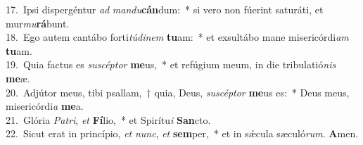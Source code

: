 {17.~}Ipsi dispergéntur \textit{ad} \textit{man}\textit{du}\textbf{cán}dum:~* si vero non fúerint saturáti, et mur\textit{mu}\textbf{rá}bunt.\\
{18.~}Ego autem cantábo forti\textit{tú}\textit{di}\textit{nem} \textbf{tu}am:~* et exsultábo mane misericórdi\textit{am} \textbf{tu}am.\\
{19.~}Quia factus es \textit{su}\textit{scép}\textit{tor} \textbf{me}us,~* et refúgium meum, in die tribulatió\textit{nis} \textbf{me}æ.\\
{20.~}Adjútor meus, tibi psallam,~† quia, Deus, \textit{su}\textit{scép}\textit{tor} \textbf{me}us es:~* Deus meus, misericórdi\textit{a} \textbf{me}a.\\
{21.~}Glória \textit{Pa}\textit{tri}, \textit{et} \textbf{Fí}lio,~* et Spirítu\textit{i} \textbf{San}cto.\\
{22.~}Sicut erat in princípio, \textit{et} \textit{nunc}, \textit{et} \textbf{sem}per,~* et in sǽcula sæculó\textit{rum}. \textbf{A}men.\\
